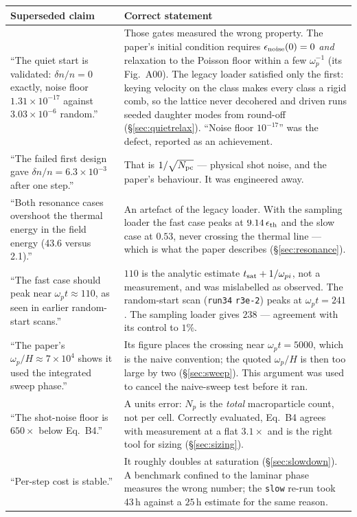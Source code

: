 \documentclass[11pt,a4paper]{article}
\newcommand{\code}[1]{\texttt{\small #1}}
\newcommand{\wpt}{\omega_p t}
\newcommand{\Npc}{N_{\rm pc}}
\begin{document}
\begin{center}\small
\begin{tabular}{@{}p{5.0cm}p{9.4cm}@{}}
\toprule
Superseded claim & Correct statement \\
\midrule
``The quiet start is validated: $\delta n/n = 0$ exactly, noise floor
$1.31\times10^{-17}$ against $3.03\times10^{-6}$ random.''
& Those gates measured the wrong property. The paper's initial condition requires
  $\epsilon_{\rm noise}(0)=0$ \emph{and} relaxation to the Poisson floor within a few
  $\omega_p^{-1}$ (its Fig.~A00). The legacy loader satisfied only the first: keying
  velocity on the class makes every class a rigid comb, so the lattice never
  decohered and driven runs seeded daughter modes from round-off
  (\S\ref{sec:quietrelax}). ``Noise floor $10^{-17}$'' was the defect, reported as
  an achievement. \\
\addlinespace
``The failed first design gave $\delta n/n = 6.3\times10^{-3}$ after one step.''
& That is $1/\sqrt{\Npc}$ --- physical shot noise, and the paper's behaviour. It was
  engineered away. \\
\addlinespace
``Both resonance cases overshoot the thermal energy in the field energy (43.6 versus
2.1).''
& An artefact of the legacy loader. With the sampling loader the fast case peaks at
  $9.14\,\epsilon_{\rm th}$ and the slow case at $0.53$, never crossing the thermal
  line --- which is what the paper describes (\S\ref{sec:resonance}). \\
\addlinespace
``The fast case should peak near $\wpt \approx 110$, as seen in earlier random-start
scans.''
& $110$ is the analytic estimate $t_{\rm sat} + 1/\omega_{pi}$, not a measurement,
  and was mislabelled as observed. The random-start scan (\code{run34} \code{r3e-2})
  peaks at $\wpt = 241$. The sampling loader gives $238$ --- agreement with its
  control to $1\%$. \\
\addlinespace
``The paper's $\omega_p/H\approx7\times10^4$ shows it used the integrated sweep
phase.''
& Its figure places the crossing near $\wpt = 5000$, which is the naive convention;
  the quoted $\omega_p/H$ is then too large by two (\S\ref{sec:sweep}). This argument
  was used to cancel the naive-sweep test before it ran. \\
\addlinespace
``The shot-noise floor is $650\times$ below Eq.~B4.''
& A units error: $N_p$ is the \emph{total} macroparticle count, not per cell.
  Correctly evaluated, Eq.~B4 agrees with measurement at a flat $3.1\times$ and is
  the right tool for sizing (\S\ref{sec:sizing}). \\
\addlinespace
``Per-step cost is stable.''
& It roughly doubles at saturation (\S\ref{sec:slowdown}). A benchmark confined to
  the laminar phase measures the wrong number; the \code{slow} re-run took 43\,h
  against a $25$\,h estimate for the same reason. \\
\bottomrule
\end{tabular}
\end{center}
\end{document}
